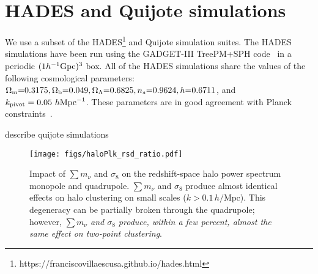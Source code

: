 \documentclass[12pt, letterpaper, preprint]{aastex62}
\newcommand{\Om}{\Omega_{\rm m}}
\newcommand{\Ob}{\Omega_{\rm b}}
\newcommand{\OL}{\Omega_\Lambda}
\newcommand{\smnu}{\sum m_\nu}
\newcommand{\sig}{\sigma_8}
\newcommand{\hmpc}{\,h/\mathrm{Mpc}}
\newcommand{\ch}[1]{{\color{orange}{\bf CH:} #1}}
\begin{document}
\section{HADES and Quijote simulations} \label{sec:hades} 
We use a subset of the HADES\footnote{https://franciscovillaescusa.github.io/hades.html} 
and Quijote simulation suites. The HADES simulations have been run
using the {\sc GADGET-III} TreePM+SPH code~\citep{springel2005} in a 
periodic $(1 h^{-1}{\rm Gpc})^3$ box. All of the HADES simulations 
share the values of the following cosmological parameters:
$\Om{=}0.3175, \Ob{=}0.049, \OL{=}0.6825, n_s{=}0.9624, h{=}0.6711$, 
and $k_{\rm pivot} = 0.05~h{\rm Mpc}^{-1}$. These parameters are in
good agreement with Planck constraints~\cite{planck2016}. 


\ch{describe quijote simulations} 

\begin{figure}
\begin{center}
\texttt{[image: figs/haloPlk\_rsd\_ratio.pdf]}
    \caption{Impact of $\smnu$ and $\sig$ on the redshift-space halo power 
    spectrum monopole and quadrupole. $\smnu$ and $\sig$ produce almost identical 
    effects on halo clustering on small scales ($k > 0.1\hmpc$). This degeneracy 
    can be partially broken through the quadrupole; however, {\em $\smnu$ and $\sig$ 
    produce, within a few percent, almost the same effect on two-point clustering}.
    }
\label{fig:plk}
\end{center}
\end{figure}

\end{document}
